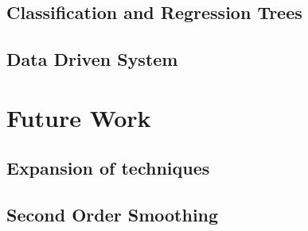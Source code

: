 \documentclass[bsc,frontabs,twoside,singlespacing,parskip]{infthesis}
\begin{document}
\subsection{Classification and Regression Trees}

\subsection{Data Driven System}

\section{Future Work}

\subsection{Expansion of techniques}

\subsection{Second Order Smoothing}
	


\end{document}
